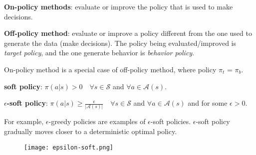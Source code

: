\documentclass[sutton_barto_notes.tex]{subfiles}
\begin{document}
\begin{definition}
\textbf{On-policy methods}: evaluate or improve the policy that is used to make decisions.
\end{definition}
\begin{definition}
\textbf{Off-policy method}: evaluate or improve a policy different from the one used to generate the data (make decisions). The policy being evaluated/improved is \textit{target policy}, and the one generate behavior is \textit{behavior policy}.
\end{definition}

On-policy method is a special case of off-policy method, where policy $\pi_t$ = $\pi_b$.

\begin{definition}
\textbf{soft policy}: $\pi(a|s) > 0\quad \forall s \in \mathcal{S}$ and $\forall a \in \mathcal{A}(s).$
\end{definition}

\begin{definition}
\textbf{$\epsilon$-soft policy}: $\pi(a|s) \geq \frac{\epsilon}{|\mathcal{A}(s)|} \quad \forall s \in \mathcal{S}$ and $\forall a \in \mathcal{A}(s)$ and for some $\epsilon > 0$.
\end{definition}

For example, $\epsilon$-greedy policies are examples of $\epsilon$-soft policies. 
$\epsilon$-soft policy gradually moves closer to a deterministic optimal policy.

\begin{figure}[!h]
  \centering
  \texttt{[image: epsilon-soft.png]}
  \label{fig:GPI}
\end{figure}
\end{document}
